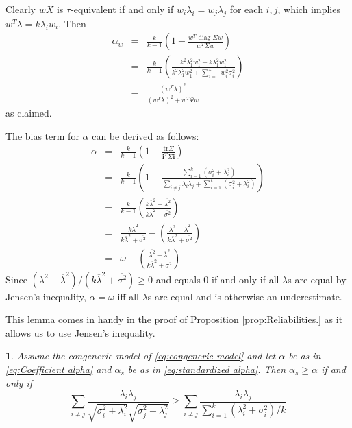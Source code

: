 \documentclass{article}
\makeatletter
\theoremstyle{plain}
\theoremstyle{plain}
\newtheorem{lem}{\protect\lemmaname}
\theoremstyle{definition}
\theoremstyle{remark}
\theoremstyle{definition}
\theoremstyle{plain}
\theoremstyle{plain}
\theoremstyle{definition}
\newenvironment{proof}[1][\protect\proofname]{\par
	\normalfont\topsep6\p@\@plus6\p@\relax
	\trivlist
	\itemindent\parindent
	\item[\hskip\labelsep\scshape #1]\ignorespaces
}{%
	\endtrivlist\@endpefalse
}
\providecommand{\proofname}{Proof}
\providecommand{\lemmaname}{Lemma}
\DeclareMathOperator{\diag}{diag}
\makeatother
\begin{document}
\begin{proof}[Proof of Proposition \ref{prop:weighted alpha}]
\label{proof:weighted alpha}Clearly $wX$ is $\tau$-equivalent
if and only if $w_{i}\lambda_{i}=w_{j}\lambda_{j}$ for each $i,j$,
which implies $w^{T}\lambda=k\lambda_{i}w_{i}$. Then
\begin{eqnarray*}
\alpha_{w} & = & \frac{k}{k-1}\left(1-\frac{w^{T}\diag\Sigma w}{w^{T}\Sigma w}\right)\\
 & = & \frac{k}{k-1}\left(\frac{k^{2}\lambda_{1}^{2}w_{1}^{2}-k\lambda_{1}^{2}w_{1}^{2}}{k^{2}\lambda_{1}^{2}w_{1}^{2}+\sum_{i=1}^{k}w_{i}^{2}\sigma_{i}^{2}}\right)\\
 & = & \frac{(w^{T}\lambda)^{2}}{(w^{T}\lambda)^{2}+w^{T}\Psi w}
\end{eqnarray*}
as claimed.

The bias term for $\alpha$ can be derived as follows:
\begin{eqnarray*}
\alpha & = & \frac{k}{k-1}\left(1-\frac{\textrm{tr}\Sigma}{\mathbf{i}^{T}\Sigma\mathbf{i}}\right)\\
 & = & \frac{k}{k-1}\left(1-\frac{\sum_{i=1}^{k}\left(\sigma_{i}^{2}+\lambda_{i}^{2}\right)}{\sum_{i\neq j}\lambda_{i}\lambda_{j}+\sum_{i=1}^{k}\left(\sigma_{i}^{2}+\lambda_{i}^{2}\right)}\right)\\
 & = & \frac{k}{k-1}\left(\frac{k\overline{\lambda}^{2}-\overline{\lambda^{2}}}{k\overline{\lambda}^{2}+\overline{\sigma^{2}}}\right)\\
 & = & \frac{k\overline{\lambda}^{2}}{k\overline{\lambda}^{2}+\overline{\sigma^{2}}}-\left(\frac{\overline{\lambda^{2}}-\overline{\lambda}^{2}}{k\overline{\lambda}^{2}+\overline{\sigma^{2}}}\right)\\
 & = & \omega-\left(\frac{\overline{\lambda^{2}}-\overline{\lambda}^{2}}{k\overline{\lambda}^{2}+\overline{\sigma^{2}}}\right)
\end{eqnarray*}
Since $(\overline{\lambda^{2}}-\overline{\lambda}^{2})/(k\overline{\lambda}^{2}+\overline{\sigma^{2}})\geq0$
and equals $0$ if and only if all $\lambda$s are equal by Jensen's inequality, $\alpha=\omega$
iff all $\lambda$s are equal and is otherwise an underestimate.


\end{proof}


This lemma comes in handy in the proof of Proposition \ref{prop:Reliabilities.} as it allows us to use Jensen's inequality.

\begin{lem}
Assume the congeneric model of \eqref{eq:congeneric model} and let $\alpha$ be as in \eqref{eq:Coefficient alpha} and $\alpha_s$ be as in \eqref{eq:standardized alpha}. Then $\alpha_{s}\geq\alpha$
if and only if
\begin{equation}
\label{eq:alpha_s_alpha_inequality}
\sum_{i\neq j}\frac{\lambda_{i}\lambda_{j}}{\sqrt{\sigma_{i}^{2}+\lambda_{i}^{2}}\sqrt{\sigma_j^{2}+\lambda_{j}^{2}}} 
\geq
\sum_{i\neq j}\frac{\lambda_{i}\lambda_{j}}{\sum_{i=1}^{k}\left(\lambda_{i}^{2}+\sigma_{i}^{2}\right)/k}
\end{equation}
\end{lem}
\end{document}
